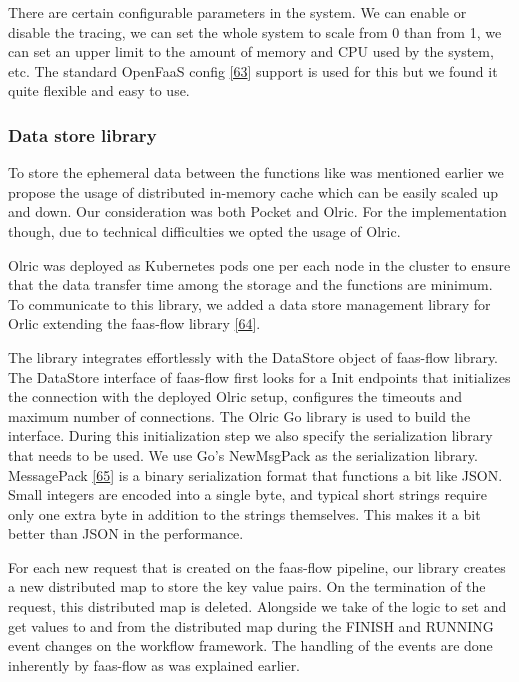 \documentclass[12pt,titlepage]{article}
\begin{document}
There are certain configurable parameters in the system. We can enable or
disable the tracing, we can set the whole system to scale from 0 than from 1, we
can set an upper limit to the amount of memory and CPU used by the system, etc.
The standard OpenFaaS config \hyperref[ref:63]{[63}] support is used for this but we found it quite
flexible and easy to use.

\subsubsection{Data store library}
\label{sec:org46f384f}
To store the ephemeral data between the functions like was mentioned earlier we
propose the usage of distributed in-memory cache which can be easily scaled up
and down. Our consideration was both Pocket and Olric. For the implementation
though, due to technical difficulties we opted the usage of Olric.

Olric was deployed as Kubernetes pods one per each node in the cluster to ensure
that the data transfer time among the storage and the functions are minimum. To
communicate to this library, we added a data store management library for Orlic
extending the faas-flow library \hyperref[ref:64]{[64}].

The library integrates effortlessly with the DataStore object of faas-flow
library. The DataStore interface of faas-flow first looks for a Init endpoints
that initializes the connection with the deployed Olric setup, configures the
timeouts and maximum number of connections. The Olric Go library is used to
build the interface. During this initialization step we also specify the
serialization library that needs to be used. We use Go's NewMsgPack as the
serialization library. MessagePack \hyperref[ref:65]{[65}] is a binary serialization format that
functions a bit like JSON. Small integers are encoded into a single byte, and
typical short strings require only one extra byte in addition to the strings
themselves. This makes it a bit better than JSON in the performance.

For each new request that is created on the faas-flow pipeline, our library
creates a new distributed map to store the key value pairs. On the termination
of the request, this distributed map is deleted. Alongside we take of the logic
to set and get values to and from the distributed map during the FINISH and
RUNNING event changes on the workflow framework. The handling of the events are
done inherently by faas-flow as was explained earlier.
\end{document}
